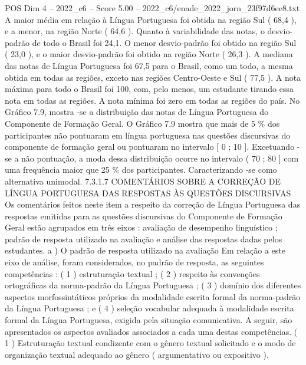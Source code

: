 \begin{textsample}{POS Dim 4 – 2022\_c6 – Score 5.00 – 2022\_c6/enade\_2022\_jorn\_23f97d6ee8.txt}
A maior média em relação à Língua Portuguesa foi obtida na região Sul ( 68,4 ), e a menor, na região Norte ( 64,6 ).
Quanto à variabilidade das notas, o desvio-padrão de todo o Brasil foi 24,1.
O menor desvio-padrão foi obtido na região Sul ( 23,0 ), e o maior desvio-padrão foi obtido na região Norte ( 26,3 ).
A mediana das notas de Língua Portuguesa foi 67,5 para o Brasil, como um todo, a mesma obtida em todas as regiões, exceto nas regiões Centro-Oeste e Sul ( 77,5 ).
A nota máxima para todo o Brasil foi 100, com, pelo menos, um estudante tirando essa nota em todas as regiões.
A nota mínima foi zero em todas as regiões do país.
No Gráfico 7.9, mostra -se a distribuição das notas de Língua Portuguesa do Componente de Formação Geral.
O Gráfico 7.9 mostra que mais de 5 \% dos participantes não pontuaram em língua portuguesa nas questões discursivas do componente de formação geral ou pontuaram no intervalo [ 0 ; 10 ].
Excetuando -se a não pontuação, a moda dessa distribuição ocorre no intervalo ( 70 ; 80 ] com uma frequência maior que 25 \% dos participantes.
Caracterizando -se como alternativa unimodal. 7.3.1.7 COMENTÁRIOS SOBRE A CORREÇÃO DE LÍNGUA PORTUGUESA DAS RESPOSTAS ÀS QUESTÕES DISCURSIVAS Os comentários feitos neste item a respeito da correção de Língua Portuguesa das respostas emitidas para as questões discursivas do Componente de Formação Geral estão agrupados em três eixos : avaliação de desempenho linguístico ; padrão de resposta utilizado na avaliação e análise das respostas dadas pelos estudantes. a ) O padrão de resposta utilizado na avaliação Em relação a este eixo de análise, foram considerados, no padrão de resposta, as seguintes competências : ( 1 ) estruturação textual ; ( 2 ) respeito às convenções ortográficas da norma-padrão da Língua Portuguesa ; ( 3 ) domínio dos diferentes aspectos morfossintáticos próprios da modalidade escrita formal da norma-padrão da Língua Portuguesa ; e ( 4 ) seleção vocabular adequada à modalidade escrita formal da Língua Portuguesa, exigida pela situação comunicativa.
A seguir, são apresentados os aspectos avaliados associados a cada uma destas competências. ( 1 ) Estruturação textual condizente com o gênero textual solicitado e o modo de organização textual adequado ao gênero ( argumentativo ou expositivo ).

\end{textsample}
